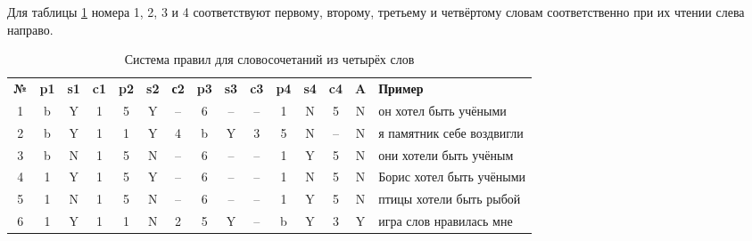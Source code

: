 \documentclass[main]{subfiles}
\begin{document}
Для таблицы \ref{tab3} номера 1, 2, 3 и 4 соответствуют первому, второму, третьему и четвёртому словам соответственно при их чтении слева направо.
\begin{longtable}[c]{|c|c|c|c|c|c|c|c|c|c|c|c|c|c|p{90px}|}
	\captionsetup{format=hang,labelsep = endash, singlelinecheck=false}
	\caption{Система правил для словосочетаний из четырёх слов}\label{tab3}\\
	\hline
	\textbf{№}&\textbf{p1} &\textbf{s1}&\textbf{c1}&\textbf{p2}&\textbf{s2}&\textbf{с2}&\textbf{p3}&\textbf{s3}&\textbf{c3}&\textbf{p4} &\textbf{s4}&\textbf{c4}&\textbf{A}&\textbf{Пример} \\ \hline
	1 &b  &Y  &1  &5  &Y  &--&6  &--&--&1&N&5&N&он хотел быть учёными \\ \hline
	2&b&Y&1&1&Y&4&b&Y&3&5&N&--&N&я памятник себе воздвигли\\ \hline
	3&b&N&1&5&N&--&6&--&--&1&Y&5&N&они хотели быть учёным\\ \hline
	4&1&Y&1&5&Y&--&6&--&--&1&N&5&N&Борис хотел быть учёными\\ \hline
	5&1&N&1&5&N&--&6&--&--&1&Y&5&N&птицы хотели быть рыбой\\ \hline
	6&1&Y&1&1&N&2&5&Y&--&b&Y&3&Y&игра слов нравилась мне\\ \hline
\end{longtable}
\end{document}
